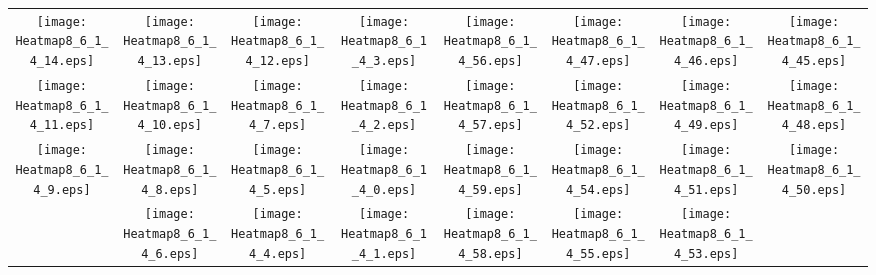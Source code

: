 \documentclass{standalone}
\begin{document}
\begin{tabular}{ *8{c} }
\texttt{[image: Heatmap8\_6\_1\_4\_14.eps]} & \texttt{[image: Heatmap8\_6\_1\_4\_13.eps]} & \texttt{[image: Heatmap8\_6\_1\_4\_12.eps]} & \texttt{[image: Heatmap8\_6\_1\_4\_3.eps]} & \texttt{[image: Heatmap8\_6\_1\_4\_56.eps]} & \texttt{[image: Heatmap8\_6\_1\_4\_47.eps]} & \texttt{[image: Heatmap8\_6\_1\_4\_46.eps]} & \texttt{[image: Heatmap8\_6\_1\_4\_45.eps]} \\
\texttt{[image: Heatmap8\_6\_1\_4\_11.eps]} & \texttt{[image: Heatmap8\_6\_1\_4\_10.eps]} & \texttt{[image: Heatmap8\_6\_1\_4\_7.eps]} & \texttt{[image: Heatmap8\_6\_1\_4\_2.eps]} & \texttt{[image: Heatmap8\_6\_1\_4\_57.eps]} & \texttt{[image: Heatmap8\_6\_1\_4\_52.eps]} & \texttt{[image: Heatmap8\_6\_1\_4\_49.eps]} & \texttt{[image: Heatmap8\_6\_1\_4\_48.eps]} \\
\texttt{[image: Heatmap8\_6\_1\_4\_9.eps]} & \texttt{[image: Heatmap8\_6\_1\_4\_8.eps]} & \texttt{[image: Heatmap8\_6\_1\_4\_5.eps]} & \texttt{[image: Heatmap8\_6\_1\_4\_0.eps]} & \texttt{[image: Heatmap8\_6\_1\_4\_59.eps]} & \texttt{[image: Heatmap8\_6\_1\_4\_54.eps]} & \texttt{[image: Heatmap8\_6\_1\_4\_51.eps]} & \texttt{[image: Heatmap8\_6\_1\_4\_50.eps]} \\
 & \texttt{[image: Heatmap8\_6\_1\_4\_6.eps]} & \texttt{[image: Heatmap8\_6\_1\_4\_4.eps]} & \texttt{[image: Heatmap8\_6\_1\_4\_1.eps]} & \texttt{[image: Heatmap8\_6\_1\_4\_58.eps]} & \texttt{[image: Heatmap8\_6\_1\_4\_55.eps]} & \texttt{[image: Heatmap8\_6\_1\_4\_53.eps]} &  
\end{tabular}
\end{document}
